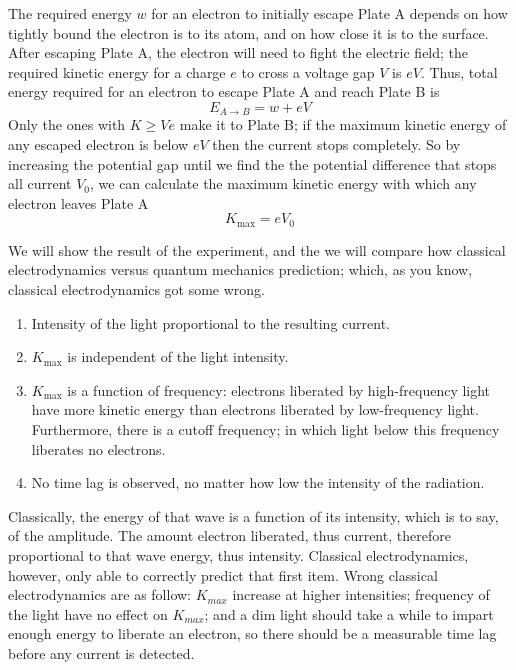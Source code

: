 \documentclass[../../../main.tex]{subfiles}
\begin{document}
The required energy $w$ for an electron to initially escape Plate A depends on how tightly bound the electron is to its atom, and on how close it is to the surface. After escaping Plate A, the electron will need to fight the electric field; the required kinetic energy for a charge $e$ to cross a voltage gap $V$ is $eV$. Thus, total energy required for an electron to escape Plate A and reach Plate B is 
\begin{equation*}
    E_{A\rightarrow B}=w+eV
\end{equation*}
Only the ones with $K \geq Ve$ make it to Plate B; if the maximum kinetic energy of any escaped electron
is below $eV$ then the current stops completely. So by increasing the potential gap until we find the the potential difference that stops all current $V_0$, we can calculate the maximum kinetic energy with which any electron leaves Plate A
\begin{equation*}
    K_{\text{max}}=eV_0
\end{equation*}

We will show the result of the experiment, and the we will compare how classical electrodynamics versus quantum mechanics prediction; which, as you know, classical electrodynamics got some wrong.
\begin{enumerate}
    \item Intensity of the light proportional to the resulting current.
    \item $K_{\text{max}}$ is independent of the light intensity.
    \item $K_{\text{max}}$ is a function of frequency: electrons liberated by high-frequency light have more kinetic energy than electrons liberated by low-frequency light. Furthermore, there is a cutoff frequency; in which light below this frequency liberates no electrons.
    \item No time lag is observed, no matter how low the intensity of the radiation. 
\end{enumerate}

Classically, the energy of that wave is a function of its intensity, which is to say, of the amplitude. The amount electron liberated, thus current, therefore proportional to that wave energy, thus intensity. Classical electrodynamics, however, only able to correctly predict that first item. Wrong classical electrodynamics are as follow: $K_{max}$ increase at higher intensities; frequency of the light have no effect on $K_{max}$; and a dim light should take a while to impart enough energy to liberate an electron, so there should be a measurable time lag before any current is detected.
\end{document}
